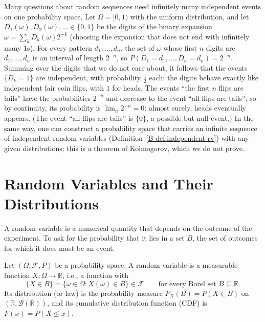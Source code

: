 \begin{example}\label{B-ex:coin-flips}
    Many questions about random sequences need infinitely many independent events on one probability space. Let $\Omega = [0, 1)$ with the uniform distribution, and let $D_1(\omega), D_2(\omega), \ldots \in \{0, 1\}$ be the digits of the binary expansion $\omega = \sum_k D_k(\omega)2^{-k}$ (choosing the expansion that does not end with infinitely many $1$s). For every pattern $d_1, \ldots, d_n$, the set of $\omega$ whose first $n$ digits are $d_1, \ldots, d_n$ is an interval of length $2^{-n}$, so $P(D_1 = d_1, \ldots, D_n = d_n) = 2^{-n}$. Summing over the digits that we do not care about, it follows that the events $\{D_k = 1\}$ are independent, with probability $\frac{1}{2}$ each: the digits behave exactly like independent fair coin flips, with $1$ for heads. The events ``the first $n$ flips are tails'' have the probabilities $2^{-n}$ and decrease to the event ``all flips are tails'', so by continuity, its probability is $\lim_n 2^{-n} = 0$: almost surely, heads eventually appears. (The event ``all flips are tails'' is $\{0\}$, a possible but null event.) In the same way, one can construct a probability space that carries an infinite sequence of independent random variables (Definition~\ref{B-def:independent-rv}) with any given distributions; this is a theorem of Kolmogorov, which we do not prove.
\end{example}

\section{Random Variables and Their Distributions}\label{B-sec:random-variables}

A random variable is a numerical quantity that depends on the outcome of the experiment. To ask for the probability that it lies in a set $B$, the set of outcomes for which it does must be an event.

\begin{definition}\label{B-def:random-variable}
    Let $(\Omega, \mathcal{F}, P)$ be a probability space. A random variable is a measurable function $X: \Omega \to \mathbb{R}$, i.e., a function with
    \[\{X \in B\} = \{\omega \in \Omega : X(\omega) \in B\} \in \mathcal{F} \qquad \text{for every Borel set } B \subseteq \mathbb{R}.\]
    Its distribution (or law) is the probability measure $P_X(B) = P(X \in B)$ on $(\mathbb{R}, \mathcal{B}(\mathbb{R}))$, and its cumulative distribution function (CDF) is $F(x) = P(X \leq x)$.
\end{definition}

